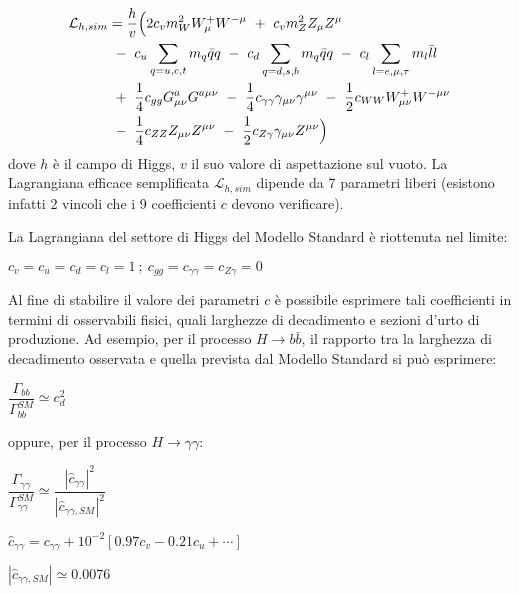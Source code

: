 \begin{equation}
\begin{split}
 \mathcal{L}_{h,sim}&=\dfrac{h}{v}\Bigl( 2c_v m^2_W W^+_\mu W^{-\mu} ~+ ~c_v m^2_Z Z_\mu Z^{\mu}\\&~- ~c_u\sum_{q=u,c,t}m_q \bar{q}q ~- ~c_d
 \sum_{q=d,s,b}m_q \bar{q}q ~- ~c_l\sum_{l=e,\mu,\tau}m_l \bar{l}l\\& ~+ ~\dfrac{1}{4}c_{gg}G^{a}_{\mu\nu}G^{a\mu\nu} ~- ~\dfrac{1}{4}
 c_{\gamma\gamma}\gamma_{\mu\nu}\gamma^{\mu\nu} ~- ~\dfrac{1}{2}c_{WW}W^{+}_{\mu\nu}W^{-\mu\nu} \\&~- ~\dfrac{1}{4}c_{ZZ}Z_{\mu\nu}Z^{\mu\nu}
 ~- ~\dfrac{1}{2}c_{Z\gamma}\gamma_{\mu\nu}Z^{\mu\nu}\Bigr)
 \end{split}
\end{equation}
dove $h$ è il campo di Higgs, $v$ il suo valore di aspettazione sul vuoto.
La Lagrangiana efficace semplificata $\mathcal{L}_{h,sim}$ dipende da 7 parametri liberi (esistono infatti 2 vincoli che
i 9 coefficienti $c$ devono verificare).

La Lagrangiana del settore di Higgs del Modello Standard è riottenuta nel limite:
\begin{center}
 $c_v=c_u=c_d=c_l=1 ~; ~c_{gg}=c_{\gamma\gamma}=c_{Z\gamma}=0$
\end{center}

Al fine di stabilire il valore dei parametri $c$ è possibile esprimere tali coefficienti in termini di osservabili fisici, quali
larghezze di decadimento e sezioni d'urto di produzione.
\newline
Ad esempio, per il processo $H\rightarrow b\bar{b}$, il rapporto tra la larghezza di decadimento osservata e quella prevista dal Modello Standard si può esprimere:
\begin{center}
 $\dfrac{\Gamma_{bb}}{\Gamma_{bb}^{SM}}\simeq c^{2}_{d}$
\end{center}

oppure, per il processo $H\rightarrow\gamma\gamma$:
\begin{center}
 $\dfrac{\Gamma_{\gamma\gamma}}{\Gamma^{SM}_{\gamma\gamma}}\simeq\dfrac{|\hat{c}_{\gamma\gamma}|^{2}}{|
 \hat{c}_{\gamma\gamma,SM}|^2}$
 \end{center}
\begin{center}
 $\hat{c}_{\gamma\gamma}=c_{\gamma\gamma}+10^{-2}[0.97c_v - 0.21c_u +\cdots]$
\end{center}
\begin{center}
 $|\hat{c}_{\gamma\gamma,SM}|\simeq0.0076$
\end{center}

